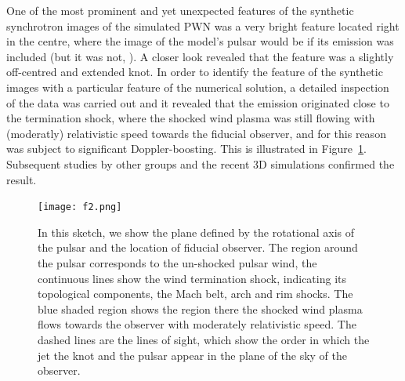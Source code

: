 One of the most prominent and yet unexpected features of the synthetic synchrotron images of the simulated PWN was 
a very bright feature located right in the centre, where the image of the model’s pulsar would be if its emission was included (but it was not, \cite{ssk-lyub-03,ssk-lyub-04}).  A closer look revealed that the feature was a slightly off-centred and extended knot.  In order to identify the feature of the synthetic images with a particular feature of the numerical solution,  a detailed inspection of the data was carried out and it revealed that the emission originated close to the termination shock, where the shocked wind plasma was still flowing with  (moderatly) relativistic speed towards the fiducial observer,  and for this reason was subject to significant 
Doppler-boosting.  This is illustrated in Figure~\ref{knot-mhd-model}. Subsequent  studies by other groups \cite{delzanna-06} and  the recent 3D simulations \citep{porth-13,porth-14} confirmed the result.       

\begin{figure}[h!]
\begin{center}
\texttt{[image: f2.png]}
\caption{In this sketch, we show the plane defined by the rotational axis of the pulsar and the location of fiducial  observer.  The region around the pulsar corresponds to the un-shocked  pulsar wind, the continuous lines show the wind termination shock, indicating its topological components, the Mach belt, arch and rim shocks. The blue shaded region shows the region there the shocked wind plasma flows towards the observer with moderately relativistic speed. The dashed lines are the lines of sight, which show the order in which the jet the knot and the pulsar appear in the plane of the sky of the observer.   
}
\end{center}
\label{knot-mhd-model}
\end{figure}

